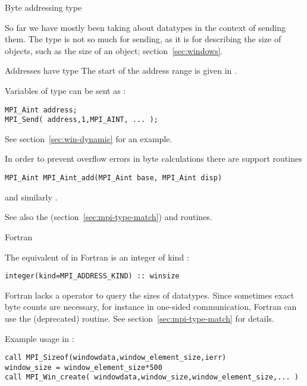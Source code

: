 {Byte addressing type}
\label{sec:mpi-byte-type}

So far we have mostly been taking about datatypes in the context of
sending them. The  type is not so much for
sending, as it is for describing the size of objects, such as the size
of an  object; section~\ref{sec:windows}.

Addresses have type  The start of the address range is
given in .

Variables of type  can be sent as :
\begin{lstlisting}
MPI_Aint address;
MPI_Send( address,1,MPI_AINT, ... );
\end{lstlisting}
See section~\ref{sec:win-dynamic} for an example.

In order to prevent overflow errors in byte calculations
there are support routines 
\begin{lstlisting}
MPI_Aint MPI_Aint_add(MPI_Aint base, MPI_Aint disp)
\end{lstlisting}
and similarly .

See also the 
(section~\ref{sec:mpi-type-match})
and
 routines.

 {Fortran}

The equivalent of
 in Fortran
is an integer of kind :
\lstset{style=reviewcode,language=Fortran} %
\begin{lstlisting}
integer(kind=MPI_ADDRESS_KIND) :: winsize
\end{lstlisting}
\lstset{style=reviewcode,language=C} %

Fortran lacks a  operator to query the sizes of datatypes.
Since sometimes exact byte counts are necessary,
for instance in one-sided communication,
Fortran can use the (deprecated)  routine.
See section~\ref{sec:mpi-type-match} for details.

Example usage in :
\lstset{language=Fortran} %
\begin{lstlisting}
call MPI_Sizeof(windowdata,window_element_size,ierr)
window_size = window_element_size*500
call MPI_Win_create( windowdata,window_size,window_element_size,... )
\end{lstlisting}
\lstset{language=C} %


